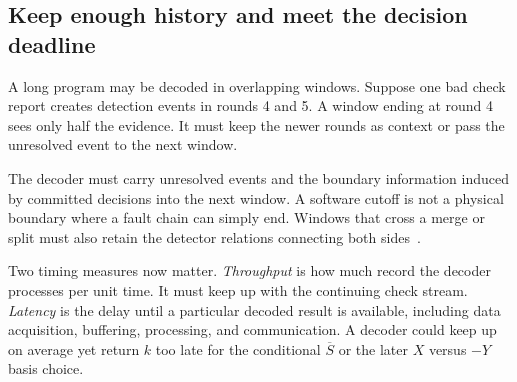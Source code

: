 \documentclass[11pt,a4paper]{article}
\begin{document}
\subsection{Keep enough history and meet the decision deadline}
A long program may be decoded in overlapping windows. Suppose one bad check report creates detection events in rounds 4 and 5. A window ending at round 4 sees only half the evidence. It must keep the newer rounds as context or pass the unresolved event to the next window.

\begin{center}
\label{fig:windows}
\end{center}

The decoder must carry unresolved events and the boundary information induced by committed decisions into the next window. A software cutoff is not a physical boundary where a fault chain can simply end. Windows that cross a merge or split must also retain the detector relations connecting both sides~\cite{windows}.

Two timing measures now matter. \emph{Throughput} is how much record the decoder processes per unit time. It must keep up with the continuing check stream. \emph{Latency} is the delay until a particular decoded result is available, including data acquisition, buffering, processing, and communication. A decoder could keep up on average yet return $k$ too late for the conditional $\overline S$ or the later $X$ versus $-Y$ basis choice.
\end{document}

